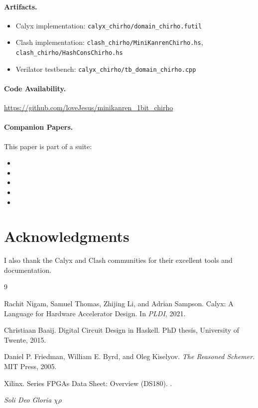 \documentclass[11pt,a4paper]{article}
\begin{document}
\paragraph{Artifacts.}
\begin{itemize}
  \item Calyx implementation: \texttt{calyx\_chirho/domain\_chirho.futil}
  \item Clash implementation: \texttt{clash\_chirho/MiniKanrenChirho.hs}, \texttt{clash\_chirho/HashConsChirho.hs}
  \item Verilator testbench: \texttt{calyx\_chirho/tb\_domain\_chirho.cpp}
\end{itemize}

\paragraph{Code Availability.}
\url{https://github.com/loveJesus/minikanren_1bit_chirho}

\paragraph{Companion Papers.}
This paper is part of a suite:
\begin{itemize}
  \item \paperA
  \item \paperB
  \item \paperC
  \item \paperD
  \item \paperF
\end{itemize}

\section*{Acknowledgments}

\standardacknowledgments

I also thank the Calyx and Clash communities for their excellent tools and
documentation.


\begin{thebibliography}{9}

Rachit Nigam, Samuel Thomas, Zhijing Li, and Adrian Sampson.
\newblock Calyx: A Language for Hardware Accelerator Design.
\newblock In \emph{PLDI}, 2021.

Christiaan Baaij.
\newblock Digital Circuit Design in Haskell.
\newblock PhD thesis, University of Twente, 2015.

Daniel P. Friedman, William E. Byrd, and Oleg Kiselyov.
\newblock \emph{The Reasoned Schemer}.
\newblock MIT Press, 2005.

Xilinx.
 Series FPGAs Data Sheet: Overview (DS180).
.

\end{thebibliography}

\vspace{1em}
\begin{center}
\textit{Soli Deo Gloria} $\chi\rho$
\end{center}
\end{document}
